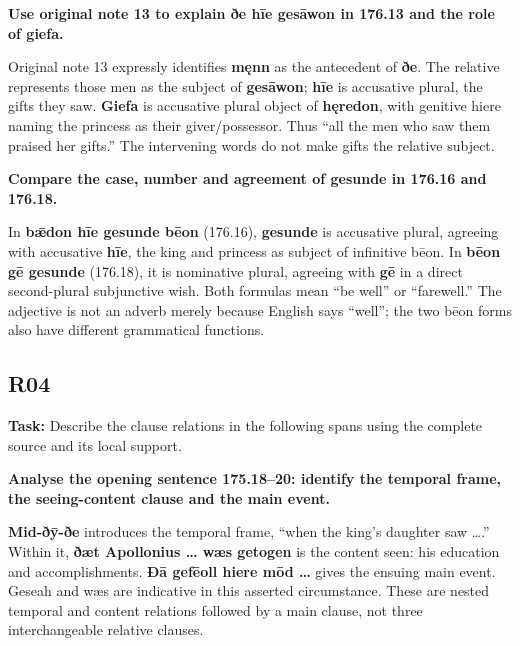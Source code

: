 \textbf{Use original note 13 to explain ðe hīe gesāwon in 176.13 and the role of giefa.}

Original note 13 expressly identifies \textbf{męnn} as the antecedent of \textbf{ðe}. The relative represents those men as the subject of \textbf{gesāwon}; \textbf{hīe} is accusative plural, the gifts they saw. \textbf{Giefa} is accusative plural object of \textbf{hęredon}, with genitive hiere naming the princess as their giver/\allowbreak{}possessor. Thus “all the men who saw them praised her gifts.” The intervening words do not make gifts the relative subject.

\textbf{Compare the case, number and agreement of gesunde in 176.16 and 176.18.}

In \textbf{bǣdon hīe gesunde bēon} (176.16), \textbf{gesunde} is accusative plural, agreeing with accusative \textbf{hīe}, the king and princess as subject of infinitive bēon. In \textbf{bēon gē gesunde} (176.18), it is nominative plural, agreeing with \textbf{gē} in a direct second-plural subjunctive wish. Both formulas mean “be well” or “farewell.” The adjective is not an adverb merely because English says “well”; the two bēon forms also have different grammatical functions.

\subsection*{R04}

\textbf{Task:} Describe the clause relations in the following spans using the complete source and its local support.

\textbf{Analyse the opening sentence 175.18–20: identify the temporal frame, the seeing-content clause and the main event.}

\textbf{Mid-ðȳ-ðe} introduces the temporal frame, “when the king’s daughter saw ….” Within it, \textbf{ðæt Apollonius … wæs getogen} is the content seen: his education and accomplishments. \textbf{Ðā gefēoll hiere mōd …} gives the ensuing main event. Geseah and wæs are indicative in this asserted circumstance. These are nested temporal and content relations followed by a main clause, not three interchangeable relative clauses.

